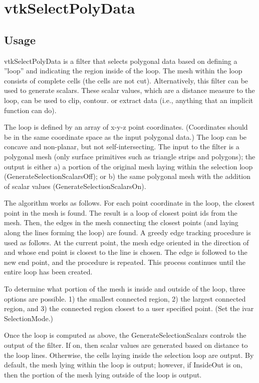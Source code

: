 \section{vtkSelectPolyData}

\subsection{Usage}

 vtkSelectPolyData is a filter that selects polygonal data based on
 defining a ''loop'' and indicating the region inside of the loop. The
 mesh within the loop consists of complete cells (the cells are not
 cut). Alternatively, this filter can be used to generate scalars.
 These scalar values, which are a distance measure to the loop, can
 be used to clip, contour. or extract data (i.e., anything that an
 implicit function can do). 

 The loop is defined by an array of x-y-z point coordinates.
 (Coordinates should be in the same coordinate space as the input
 polygonal data.) The loop can be concave and non-planar, but not
 self-intersecting. The input to the filter is a polygonal mesh
 (only surface primitives such as triangle strips and polygons); the
 output is either a) a portion of the original mesh laying within
 the selection loop (GenerateSelectionScalarsOff); or b) the same
 polygonal mesh with the addition of scalar values
 (GenerateSelectionScalarsOn).

 The algorithm works as follows. For each point coordinate in the
 loop, the closest point in the mesh is found. The result is a loop
 of closest point ids from the mesh. Then, the edges in the mesh
 connecting the closest points (and laying along the lines forming
 the loop) are found. A greedy edge tracking procedure is used as
 follows. At the current point, the mesh edge oriented in the
 direction of and whose end point is closest to the line is
 chosen. The edge is followed to the new end point, and the
 procedure is repeated. This process continues until the entire loop
 has been created. 
 
 To determine what portion of the mesh is inside and outside of the
 loop, three options are possible. 1) the smallest connected region,
 2) the largest connected region, and 3) the connected region
 closest to a user specified point. (Set the ivar SelectionMode.)
 
 Once the loop is computed as above, the GenerateSelectionScalars
 controls the output of the filter. If on, then scalar values are
 generated based on distance to the loop lines. Otherwise, the cells
 laying inside the selection loop are output. By default, the mesh
 lying within the loop is output; however, if InsideOut is on, then
 the portion of the mesh lying outside of the loop is output.

